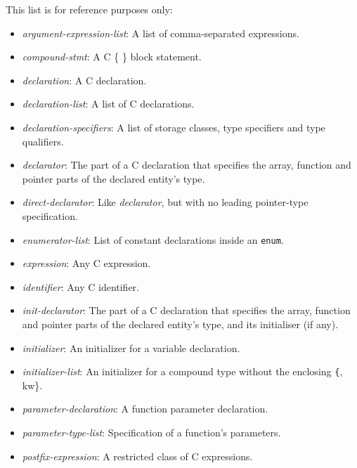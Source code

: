 \documentclass[11pt,letterpaper]{article}
\newcommand{\kw}[1]{{\tt #1}}
\begin{document}
This list is for reference purposes only:
\begin{itemize}
\item \emph{argument-expression-list}: A list of comma-separated
expressions.

\item \emph{compound-stmt}: A C \{ \} block statement.

\item \emph{declaration}: A C declaration.

\item \emph{declaration-list}: A list of C declarations.

\item \emph{declaration-specifiers}: A list of storage classes, type
specifiers and type qualifiers.

\item \emph{declarator}: The part of a C declaration that specifies
the array, function and pointer parts of the declared entity's type.

\item \emph{direct-declarator}: Like \emph{declarator}, but with no
leading pointer-type specification.

\item \emph{enumerator-list}: List of constant declarations inside an
\kw{enum}.

\item \emph{expression}: Any C expression.

\item \emph{identifier}: Any C identifier.

\item \emph{init-declarator}: The part of a C declaration that specifies
the array, function and pointer parts of the declared entity's type, and
its initialiser (if any).

\item \emph{initializer}: An initializer for a variable declaration.

\item \emph{initializer-list}: An initializer for a compound type without
the enclosing \kw{\{}, kw{\}}.

\item \emph{parameter-declaration}: A function parameter declaration.

\item \emph{parameter-type-list}: Specification of a function's parameters.

\item \emph{postfix-expression}: A restricted class of C expressions.


\end{itemize}
\end{document}
